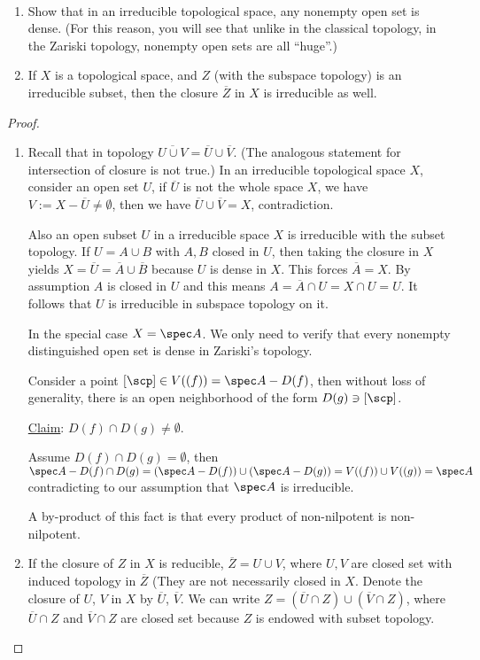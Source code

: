 \begin{exr}\label{chap3exr:irreducible_subset_dense_open_irreducible_closure}\ 
\begin{enumerate}[label=(\alph*)]
\item Show that in an irreducible topological space, any nonempty open set is dense. (For this reason, you will see that unlike in the classical topology, in the Zariski topology, nonempty open sets are all “huge”.)
\item If $X$ is a topological space, and $Z$ (with the subspace topology) is an irreducible subset, then the closure $\overline{Z}$ in $X$ is irreducible as well.
\end{enumerate}
\end{exr}
\begin{proof}
\begin{enumerate}[label=(\alph*)]
\item Recall that in topology $\overline{U\cup V}=\overline{U}\cup \overline{V}$. (The analogous statement for intersection of closure is not true.) In an irreducible topological space $X$, consider an open set $U$, if $\overline{U}$ is not the whole space $X$, we have $V:=X-\overline{U}\neq \emptyset$, then we have $\overline{U}\cup \overline{V}=X$, contradiction. 

Also an open subset $U$ in a irreducible space $X$ is irreducible with the subset topology. If $U=A\cup B$ with $A,B$ closed in $U$, then taking the closure in $X$ yields $X=\overline{U}=\overline{A}\cup \overline{B}$ because $U$ is dense in $X$. This forces $\overline{A}=X$. By assumption $A$ is closed in $U$ and this means $A=\overline{A}\cap U=X\cap U=U$. It follows that $U$ is irreducible in subspace topology on it.


In the special case $X=\spec A$. We only need to verify that every nonempty distinguished open set is dense in Zariski's topology.

Consider a point $[\scp]\in V((f))=\spec A-D(f)$, then without loss of generality, there is  an open neighborhood of the form $D(g)\ni[\scp]$. 

\underline{Claim}: $D(f)\cap D(g)\neq \emptyset$.

Assume $D(f)\cap D(g)=\emptyset$, then $\spec A-D(f)\cap D(g)=(\spec A-D(f))\cup(\spec A-D(g))=V((f))\cup V((g))=\spec A$ contradicting to our assumption that $\spec A$ is irreducible.

A by-product of this fact is that every product of non-nilpotent is non-nilpotent.

 \item If the closure of $Z$ in $X$ is reducible, $\overline{Z}=U\cup V$, where $U,V$ are closed set with induced topology in $\overline{Z}$ (They are not necessarily closed in $X$. Denote the closure of $U$, $V$ in $X$ by $\overline{U}$, $\overline{V}$. We can write $Z=(\overline{U}\cap Z)\cup (\overline{V}\cap Z)$, where $\overline{U}\cap Z$ and $\overline{V}\cap Z$ are closed set because $Z$ is endowed with subset topology.
\end{enumerate}
\end{proof}

